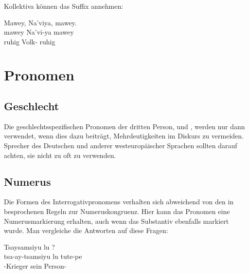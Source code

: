 \subsubsection{} Kollektiva können das Suffix  annehmen:

\begin{interlin}
	\glll \Nfilm{}Mawey, Na'viya, mawey. \\
	mawey Na'vi-ya mawey \\
	ruhig Volk- ruhig \\
\end{interlin}

\section{Pronomen}


\subsection{Geschlecht} Die geschlechtsspezifischen Pronomen der dritten Person,  und , werden nur dann verwendet, wenn dies dazu beiträgt, Mehrdeutigkeiten im Diskurs zu vermeiden. Sprecher des Deutschen und anderer westeuropäischer Sprachen sollten darauf achten, sie nicht zu oft zu verwenden. \label{syn:pron:gender}

\subsection{Numerus} Die Formen des Interrogativpronomens  verhalten sich abweichend von den in  besprochenen Regeln zur Numeruskongruenz. \label{syn:pron:q-number} Hier kann das Pronomen eine Numerusmarkierung erhalten, auch wenn das Substantiv ebenfalls markiert wurde. Man vergleiche die Antworten auf diese Fragen:

\begin{interlin}
	\glll \Npawl{}Tsaysamsiyu lu ? \\
	tsa-ay-tsamsiyu lu tute-pe \\
	-Krieger sein Person- \\
\end{interlin}

